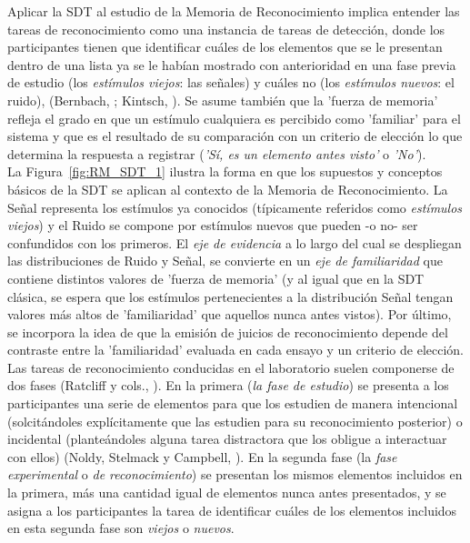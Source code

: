 Aplicar la SDT al estudio de la Memoria de Reconocimiento implica entender las tareas de reconocimiento como una instancia de tareas de detección, donde los participantes tienen que identificar cuáles de los elementos que se le presentan dentro de una lista ya se le habían mostrado con anterioridad en una fase previa de estudio (los \textit{estímulos viejos}: las señales) y cuáles no (los \textit{estímulos nuevos}: el ruido), (Bernbach, \citeyear{Bernbach1967}; Kintsch, \citeyear{Kintsch1967}). Se asume también que la 'fuerza de memoria' refleja el grado en que un estímulo cualquiera es percibido como 'familiar' para el sistema y que es el resultado de su comparación con un criterio de elección lo que determina la respuesta a registrar (\textit{'Sí, es un elemento antes visto'} o \textit{'No'}).\\ 

La Figura~\ref{fig:RM_SDT_1} ilustra la forma en que los supuestos y conceptos básicos de la SDT se aplican al contexto de la Memoria de Reconocimiento. La Señal representa los estímulos ya conocidos (típicamente referidos como \textit{estímulos viejos}) y el Ruido se compone por estímulos nuevos que pueden -o no- ser confundidos con los primeros. El \textit{eje de evidencia} a lo largo del cual se despliegan las distribuciones de Ruido y Señal, se convierte en un \textit{eje de familiaridad} que contiene distintos valores de 'fuerza de memoria' (y al igual que en la SDT clásica, se espera que los estímulos pertenecientes a la distribución Señal tengan valores más altos de 'familiaridad' que aquellos nunca antes vistos). Por último, se incorpora la idea de que la emisión de juicios de reconocimiento depende del contraste entre la 'familiaridad' evaluada en cada ensayo y un criterio de elección.\\

Las tareas de reconocimiento conducidas en el laboratorio suelen componerse de dos fases (Ratcliff y cols., \citeyear{Ratcliff1992}). En la primera (\textit{la fase de estudio}) se presenta a los participantes una serie de elementos para que los estudien de manera intencional (solcitándoles explícitamente que las estudien para su reconocimiento posterior) o incidental (planteándoles alguna tarea distractora que los obligue a interactuar con ellos) (Noldy, Stelmack y Campbell, \citeyear{Noldy1990}). En la segunda fase (la \textit{fase experimental} o \textit{de reconocimiento}) se presentan los mismos elementos incluidos en la primera, más una cantidad igual de elementos nunca antes presentados, y se asigna a los participantes la tarea de identificar cuáles de los elementos incluidos en esta segunda fase son \textit{viejos} o \textit{nuevos}.\\


